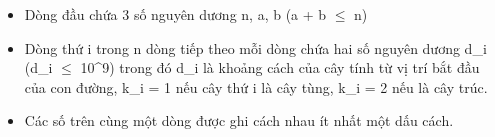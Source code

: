 \begin{itemize}
	\item Dòng đầu chứa 3 số nguyên dương n, a, b (a + b  $\le$  n)
	\item Dòng thứ i trong n dòng tiếp theo mỗi dòng chứa hai số nguyên dương d\_i (d\_i  $\le$  10^9) trong đó d\_i là khoảng cách của cây tính từ vị trí bắt đầu của con đường, k\_i = 1 nếu cây thứ i là cây tùng, k\_i = 2 nếu là cây trúc.
	\item Các số trên cùng một dòng được ghi cách nhau ít nhất một dấu cách.
\end{itemize}